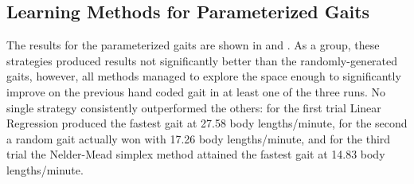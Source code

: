 


\subsection{Learning Methods for Parameterized Gaits}


The results for the parameterized gaits are shown in
 and .  As a group, these strategies
produced results not significantly better than the randomly-generated
gaits, however, all methods managed to explore the space enough to
significantly improve on the previous hand coded gait in at least one
of the three runs.  No single strategy consistently outperformed the
others: for the first trial Linear Regression produced the fastest
gait at 27.58 body lengths/minute, for the second a random gait
actually won with 17.26 body lengths/minute, and for the third trial
the Nelder-Mead simplex method attained the fastest gait at 14.83 body
lengths/minute.



% 
% 
% 


